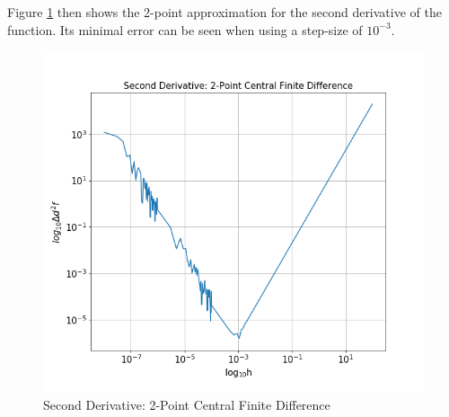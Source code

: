 \documentclass[twocolumn]{article}
\begin{document}
Figure \ref{fig:d2f2p} then shows the 2-point approximation for the second derivative of the function. Its minimal error can be seen when using a step-size of $10^{-3}$.
\begin{figure}[h!]
  \centering
  \includegraphics[scale = 0.4]{d2f2p}
  \caption{Second Derivative: 2-Point Central Finite Difference}
  \label{fig:d2f2p}
\end{figure}
\vfill\eject
\newpage


\nocite{*}
\end{document}
